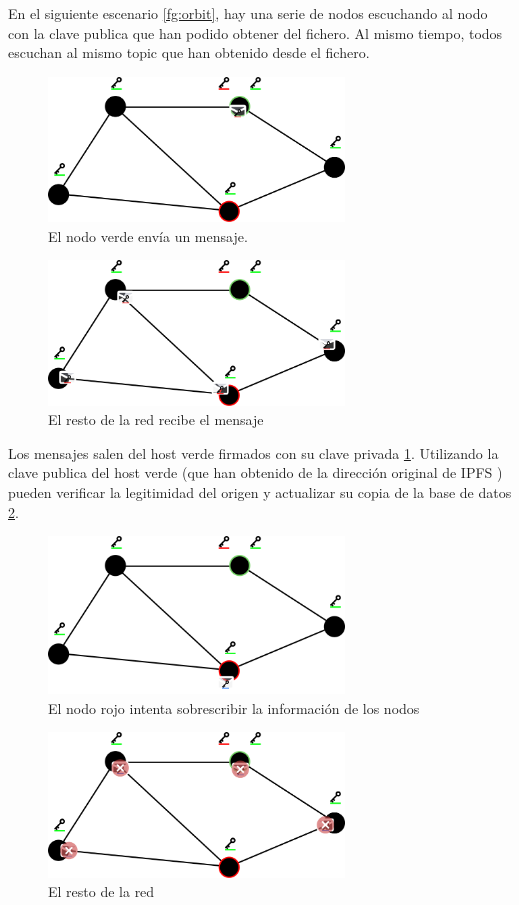 En el siguiente escenario \ref{fg:orbit}, hay una serie de nodos escuchando al nodo con la clave publica que han podido obtener del fichero. Al mismo tiempo, todos escuchan al mismo topic que han obtenido desde el fichero.
\begin{figure}[h!]
    \centering
    \includegraphics[width=0.7\textwidth]{Figures/Message sent.png}
    \caption{El nodo verde envía un mensaje.}
    \label{fg:messageSent}
\end{figure}
\begin{figure}[h!]
    \centering
    \includegraphics[width=0.7\textwidth]{Figures/Message arived.png}
    \caption{El resto de la red recibe el mensaje}
    \label{fg:messageRecived}
\end{figure}
Los mensajes salen del host verde firmados con su clave privada \ref{fg:messageSent}. Utilizando la clave publica del host verde (que han obtenido de la dirección original de IPFS \cite{web:ipfs}) pueden verificar la legitimidad del origen y actualizar su copia de la base de datos \ref{fg:messageRecived}.
\begin{figure}[h!]
    \centering
    \includegraphics[width=0.7\textwidth]{Figures/Message is compromissed.png}
    \caption{El nodo rojo intenta sobrescribir la información de los nodos}
    \label{fg:messageSentRed}
\end{figure}
\begin{figure}[h!]
    \centering
    \includegraphics[width=0.7\textwidth]{Figures/Message rejected.png}
    \caption{El resto de la red }
\end{figure}
\newpage
\thispagestyle{empty}